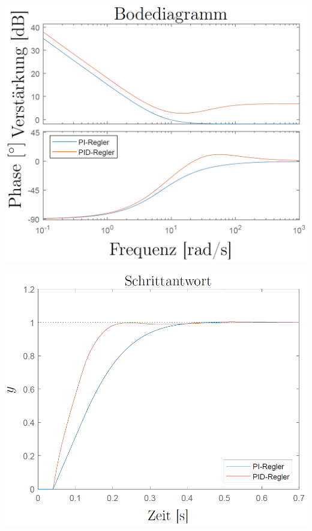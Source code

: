 \begin{minipage}[c]{0.4\columnwidth}
    \includegraphics[width=\columnwidth]{images/gleichstromantrieb_pid-regler_bodediagramm.png}
\end{minipage}
\hfill
\begin{minipage}[c]{0.4\columnwidth}
    \includegraphics[width=\columnwidth]{images/gleichstromantrieb_pid-regler_step_response.png}
\end{minipage}
